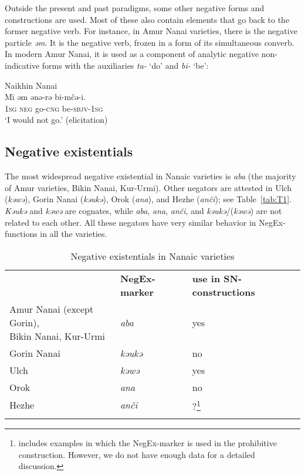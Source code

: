 \documentclass[output=paper,colorlinks,citecolor=brown]{langscibook}
\begin{document}
Outside the present and past paradigms, some other negative forms and constructions are used. Most of these also contain elements that go back to the former negative verb. For instance, in Amur Nanai varieties, there is the negative particle \textit{əm}. It is the negative verb, frozen in a form of its simultaneous converb. In modern Amur Nanai, it is used as a component of analytic negative non-indicative forms with the auxiliaries \textit{ta-} ‘do’ and \textit{bi-} ‘be’:

\ea Naikhin Nanai \label{ex:T7}\\
	\gll Mī	əm	ənə-rə	bi-mčə-i.\\
	\textsc{1sg}	\textsc{neg}	go-\textsc{cng}	be-\textsc{sbjv-1sg}\\
	\glt `I would not go.' (elicitation)
\z

\subsection{Negative existentials}\label{sec:T4.2}

The most widespread negative existential in Nanaic varieties is \textit{aba} (the majority of Amur varieties, Bikin Nanai, Kur-Urmi). Other negators are attested in Ulch (\textit{kəwə}), Gorin Nanai (\textit{kəukə}), Orok (\textit{ana}), and Hezhe (\textit{anči}); see Table \ref{tab:T1}. \textit{Kəukə} and \textit{kəwə} are cognates, while \textit{aba}, \textit{ana}, \textit{anči}, and \textit{kəukə}\slash(\textit{kəwə}) are not related to each other. All these negators have very similar behavior in NegEx-functions in all the varieties.

\begin{table}
    \caption{Negative existentials in Nanaic varieties}
    \label{tab:T2}
    \begin{tabularx}{\textwidth}{Qll}
    \lsptoprule
    & \textbf{NegEx-marker} & \textbf{use in SN-constructions} \\ \midrule
    {Amur Nanai (except Gorin),\newline Bikin Nanai, Kur-Urmi} & \textit{aba} & yes \\
    {Gorin Nanai} & \textit{kəukə} & no \\
    {Ulch} & \textit{kəwə} & yes \\
    {Orok} & \textit{ana} & no \\
    {Hezhe} & \textit{anči} & ?\footnote{\citet{zhang2013a} includes examples in which the NegEx-marker is used in the prohibitive construction. However, we do not have enough data for a detailed discussion.}
    \\ \lspbottomrule
    \end{tabularx}
\end{table}
\end{document}

